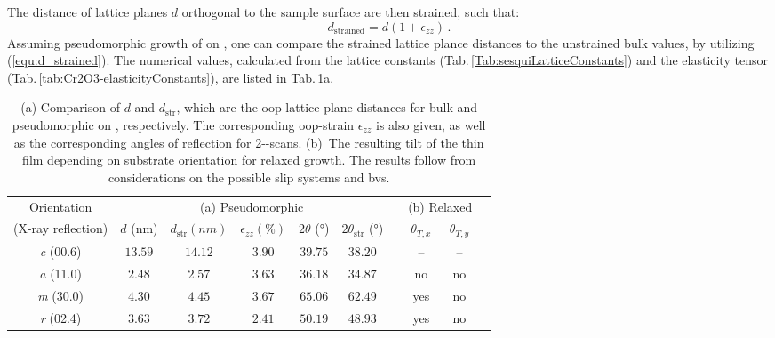 The distance of lattice planes $d$ orthogonal to the sample surface are then strained, such that:
\begin{equation}
    \label{equ:d_strained}
    d_\mathrm{strained}=d(1+\epsilon_{zz})\,.
\end{equation}
Assuming pseudomorphic growth of  on , one can compare the strained lattice plance distances to the unstrained bulk values, by utilizing (\ref{equ:d_strained}).
The numerical values, calculated from the lattice constants (Tab.\,\ref{Tab:sesquiLatticeConstants}) and the elasticity tensor (Tab.\,\ref{tab:Cr2O3-elasticityConstants}), are listed in Tab.\,\ref{tab:d_strained}a.
\begin{table}
    \centering
    \caption{
        (a) Comparison of $d$ and $d_\mathrm{str}$, which are the \gls{oop} lattice plane distances for bulk  and pseudomorphic  on , respectively.
        The corresponding \gls{oop}-strain $\epsilon_{zz}$ is also given, as well as the corresponding angles of reflection for 2\texttheta-\textomega-scans.
        (b)~The resulting tilt of the thin film depending on substrate orientation for relaxed growth. The results follow from considerations on the possible slip systems and \glspl{bv}.}
    \begin{tabular}{cccccccccc}
        \toprule
        Orientation
            & \multicolumn{5}{c}{(a) Pseudomorphic}
            &&  \multicolumn{2}{c}{(b) Relaxed}
        \\
        \cmidrule(lr){2-6}
        \cmidrule(lr){8-9}
        (X-ray reflection)
            & $d$ (\si{nm}) & $d_\mathrm{str} (\si{nm})$ & $\epsilon_{zz} (\si{\percent})$
            &$2\theta$ (\si{\degree})&$2\theta_\mathrm{str}$ (\si{\degree})&& $\theta_{T,x}$   & $\theta_{T,y}$
        \\ \midrule
        \textit{c} (00.6)& $13.59$  & $14.12$   & $3.90$    & $39.75$   & $38.20$   &&--&--\\
        \textit{a} (11.0)& $2.48 $  & $2.57 $   & $3.63$    & $36.18$   & $34.87$   &&no&no\\
        \textit{m} (30.0)& $4.30 $  & $4.45 $   & $3.67$    & $65.06$   & $62.49$   &&yes&no\\
        \textit{r} (02.4)& $3.63 $  & $3.72 $   & $2.41$    & $50.19$   & $48.93$   &&yes&no\\
        \bottomrule
    \end{tabular}
    \label{tab:d_strained}
\end{table}

